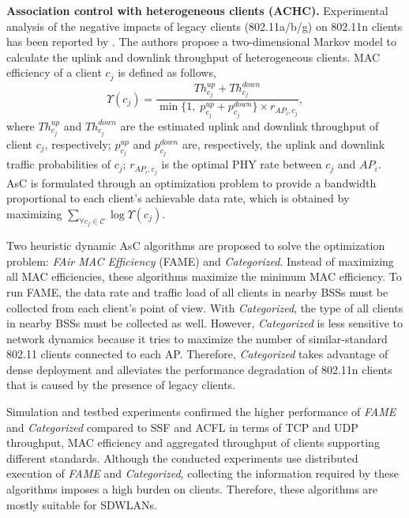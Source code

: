 
\textbf{Association control with heterogeneous clients (ACHC).}  %
Experimental analysis of the negative impacts of legacy clients (802.11a/b/g) on 802.11n clients has been reported by \cite{802.11n-AP-Association-2014}.
The authors propose a two-dimensional Markov model to calculate the uplink and downlink throughput of heterogeneous clients. 
MAC efficiency of a client $c_{j}$ is defined as follows,
\begin{equation}
\label{MACeffMetr}
\Upsilon({c_{j}}) = \frac{Th_{c_{j}}^{up}+Th_{c_{j}}^{down}}{\min\{1,\; p_{c_{j}}^{up}+p_{c_{j}}^{down}\}\times r_{AP_{i},c_{j}}},
\end{equation}
where $Th_{c_{j}}^{up}$ and $Th_{c_{j}}^{down}$  are the estimated uplink and downlink throughput of client $c_{j}$, respectively;
$p_{c_{j}}^{up}$ and $p_{c_{j}}^{down}$ are, respectively, the uplink and downlink traffic probabilities of $c_{j}$; 
$r_{AP_{i},c_{j}}$ is the optimal PHY rate between $c_{j}$ and $AP_{i}$. 
AsC is formulated through an optimization problem to provide a bandwidth proportional to each client's achievable data rate, which is obtained by maximizing $\sum_{\forall c_{j}\in \mathcal{C}} \log \Upsilon({c_{j}})$.

Two heuristic dynamic AsC algorithms are proposed to solve the optimization problem: \textit{FAir MAC Efficiency} (FAME) and \textit{Categorized}. 
Instead of maximizing all MAC efficiencies, these algorithms maximize the minimum MAC efficiency.
To run FAME, the data rate and traffic load of all clients in nearby BSSs must be collected from each client's point of view.
With \textit{Categorized}, the type of all clients in nearby BSSs must be collected as well.
However, \textit{Categorized} is less sensitive to network dynamics because it tries to maximize the number of similar-standard 802.11 clients connected to each AP.
Therefore, \textit{Categorized} takes advantage of dense deployment and alleviates the performance degradation of 802.11n clients that is caused by the presence of legacy clients. 

Simulation and testbed experiments confirmed the higher performance of \textit{FAME} and \textit{Categorized} compared to SSF and ACFL in terms of TCP and UDP throughput, MAC efficiency and aggregated throughput of clients supporting different standards.
Although the conducted experiments use distributed execution of \textit{FAME} and \textit{Categorized}, collecting the information required by these algorithms imposes a high burden on clients. 
Therefore, these algorithms are mostly suitable for SDWLANs. 



